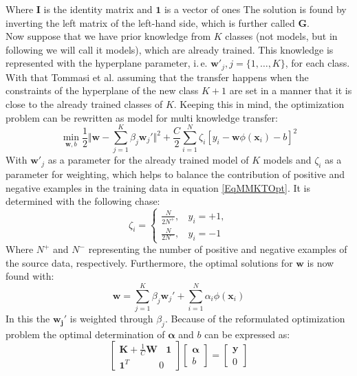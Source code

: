 Where $\mathbf{I}$ is the identity matrix and $\mathbf{1}$ is a vector of ones
The solution is found by inverting the left matrix of the left-hand side, which is further called $\mathbf{G}$.\cite{Tommasi.}\\
Now suppose that we have prior knowledge from $K$ classes (not models, but in following we will call it models), which are already trained.
This knowledge is represented with the hyperplane parameter, i.\,e. $\mathbf{w}'_j, j = \{1,\dots,K\}$, for each class.\cite{Tommasi.}\\
With that Tommasi et al. assuming that the transfer happens when the constraints of the hyperplane of the new class $K+1$ are set in a manner that it is close to the already trained classes of $K$.
Keeping this in mind, the optimization problem can be rewritten as model for multi knowledge transfer:\cite{Tommasi.}
\begin{equation}\label{EqMMKTOpt}
		\min_{\mathbf{w},b} \frac{1}{2}\Vert\mathbf{w}-\sum_{j=1}^{K}\beta_j\mathbf{w}_j'\Vert^2 + \frac{C}{2}\sum_{i=1}^{N}\zeta_i[y_i-\mathbf{w}\phi(\mathbf{x}_i)-b]^2
\end{equation}
With $\mathbf{w}'_j$ as a parameter for the already trained model of $K$ models and $\zeta_i$ as a parameter for weighting, which helps to balance the contribution of positive and negative examples in the training data in equation \eqref{EqMMKTOpt}.
It is determined with the following chase:\cite{Tommasi.}
\begin{equation}\label{EqMMKTZeta}
	\zeta_i = \begin{cases}
			\frac{N}{2N^+}, \>\>\>\> y_i = +1,\\
			\frac{N}{2N^-}, \>\>\>\> y_i = -1
	\end{cases}
\end{equation} 
Where $N^+$ and $N^-$ representing the number of positive and negative examples of the source data, respectively.
Furthermore, the optimal solutions for $\mathbf{w}$ is now found with:\cite{Tommasi.}
\begin{equation}
	\mathbf{w} = \sum_{j=1}^{K}\beta_j\mathbf{w}_j'+\sum_{i=1}^{N}\alpha_i\phi(\mathbf{x}_i)
\end{equation}
In this the $\mathbf{w_j}'$ is weighted through $\beta_j$.
Because of the reformulated optimization problem the optimal determination of $\boldsymbol{\alpha}$ and $b$ can be expressed as:\cite{Tommasi.}
\begin{equation}\label{EqMMKTParaEst}
\begin{bmatrix}
\mathbf{K}+\frac{1}{C}\mathbf{W} \>\>\>\> \mathbf{1}\\
\mathbf{1}^T \>\>\>\>\>\>\>\>\>\>\>\>\>\> 0
\end{bmatrix}
\begin{bmatrix}
\boldsymbol{\alpha}\\
b
\end{bmatrix}
= 
\begin{bmatrix}
\mathbf{y} \\
0
\end{bmatrix}
\end{equation}
